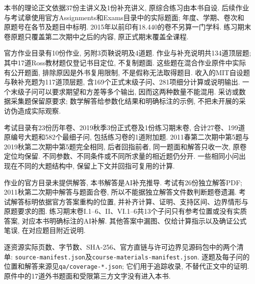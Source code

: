 \label{chap:assessment-map}

本书的理论正文依据37份主讲义及1份补充讲义, 原综合练习由本书自设. 后续作业与考试章使用官方Assignments和Exams目录中的实际题面; 年度、学期、卷次和原题号在各节及题目中标明. 2015年以前印有18.440的卷不另算一门学科. 练习期末卷原题只覆盖第二次期中之后的内容, 原正式期末覆盖全课程.

官方作业目录有10份作业, 另附3页鞅说明及4道题. 作业与补充说明共134道顶层题; 其中17道Ross教材题仅登记书目定位, 不复制题面. 这些题在混合作业原件中实际有公开题面, 排除原因是外书复用限制, 不是假称无法取得题目. 收入的MIT自设题与鞅补充题为117道顶层题, 含169个正式末级子问、281项细分计算或说明输出. 一个末级子问可以要求期望和方差等多个输出, 因而这两种数量不能混用. 采访或数据采集题保留原要求; 数学解答给参数化结果和明确标注的示例, 不把未开展的采访伪造成实际观察.

考试目录有23份历年卷、2019秋季3份正式卷及1份练习期末卷, 合计27卷、199道原编号大题和582个最细子问, 包括练习卷的1道附加题. 2011春第二次期中第5题与2019秋第二次期中第5题完全相同, 后者回指前者, 同一题面和解答只收一次, 原卷定位均保留. 不同参数、不同条件或不同所求量的相近题仍分开. 一些相同小问出现在不同的大题结构中, 保留上下文并回指可复用的计算.

作业的官方目录未提供解答, 本书解答是AI补充推导. 考试有26份独立解答PDF; 2011秋第二次期中解答与题面合卷, 所以不能据独立解答文件数判断题卷遗漏. 考试解答标明依据官方答案重构的位置, 并补齐计算、证明、支持区间、边界情形与原题要求的图. 练习期末卷I.1--6、II、VI.1--6共13个子问只有参考位置或没有实质答案, 对应本书明确标注的AI补解. 其他答案中漏图、仅给计算指示以及确证公式笔误, 在对应题目附近说明.

逐资源实际页数、字节数、SHA-256、官方直链与许可边界见源码包中的两个清单: \texttt{source-manifest.json}及\texttt{course-materials-}\allowbreak\texttt{manifest.json}. 逐题及每子问的位置和解答来源见\texttt{qa/coverage-*.json}; 它们用于追踪收录, 不替代正文中的证明. 原件中的17道外书题面和受限第三方文字没有进入本书.

